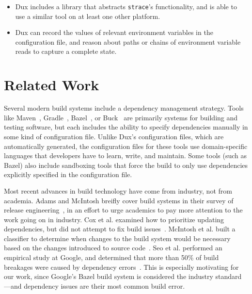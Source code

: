 \documentclass[10pt,conference]{IEEEtran}
\begin{document}
\begin{itemize}
\item{Dux includes a library that abstracts \texttt{strace}'s functionality, and is able to use a similar tool
on at least one other platform.}
\item{Dux can record the values of relevant environment variables in the configuration file,
and reason about paths or chains of environment variable reads to capture a complete state.}
\end{itemize}

\section{Related Work}

Several modern build systems include a dependency management strategy. Tools like
Maven~\cite{Maven}, Gradle~\cite{Gradle}, Bazel~\cite{blaze}, or Buck~\cite{buck}
are primarily systems for building and testing software, but each includes the
ability to specify dependencies manually in some kind of configuration file.
Unlike Dux's configuration files, which are automatically generated, the configuration
files for these tools use domain-specific languages that developers have to learn,
write, and maintain. Some tools (such as Bazel) also include sandboxing tools
that force the build to only use dependencies explicitly specified in the
configuration file.

Most recent advances in build technology have come from industry, not from
academia. Adams and McIntosh breifly cover build systems in their survey of
release engineering~\cite{adams2016modern}, in an effort to urge academics to
pay more attention to the work going on in industry. Cox et al. examined how
to prioritize updating dependencies, but did not attempt to fix build issues~\cite{cox2015measuring}.
McIntosh et al. built a classifier to determine when changes to the build
system would be necessary based on the changes introduced to source code~\cite{mcintosh2014mining}.
Seo et al. performed an empirical study at Google, and determined that more
than 50\% of build breakages were caused by dependency errors~\cite{googlebuilderrors}.
This is especially motivating for our work, since Google's Bazel build system
is considered the industry standard---and dependency issues are their most
common build error.
\end{document}
